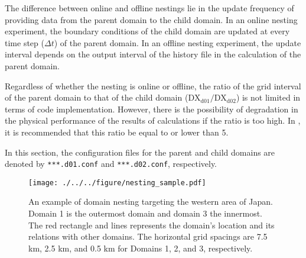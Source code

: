 The difference between online and offline nestings lie in the update frequency of providing data from the parent domain to the child domain. In an online nesting experiment, the boundary conditions of the child domain are updated at every time step ($\Delta t$) of the parent domain. In an offline nesting experiment, the update interval depends on the output interval of the history file in the calculation of the parent domain. 

Regardless of whether the nesting is online or offline, the ratio of the grid interval of the parent domain to that of the child domain  ($\mathrm{DX}_{\mathrm{d01}}/\mathrm{DX}_{\mathrm{d02}}$) is not limited in terms of code implementation. However, there is the possibility of degradation in the physical performance of the results of calculations if the ratio is too high. In \scalerm, it is recommended that this ratio be equal to or lower than 5.

In this section, the configuration files for the parent and child domains
are denoted by \verb|***.d01.conf| and \verb|***.d02.conf|, respectively.

\begin{figure}[t]
\begin{center}
  \texttt{[image: ./../../figure/nesting\_sample.pdf]}\\
  \caption{An example of domain nesting targeting the western area of Japan.
    Domain 1 is the outermost domain and domain 3 the innermost.
    The red rectangle and lines represents the domain’s location and its relations with other domains.
    The horizontal grid spacings are 7.5 km, 2.5 km, and 0.5 km for Domains 1, 2, and 3, respectively.
  }
  \label{fig_nestsample}
\end{center}
\end{figure}



